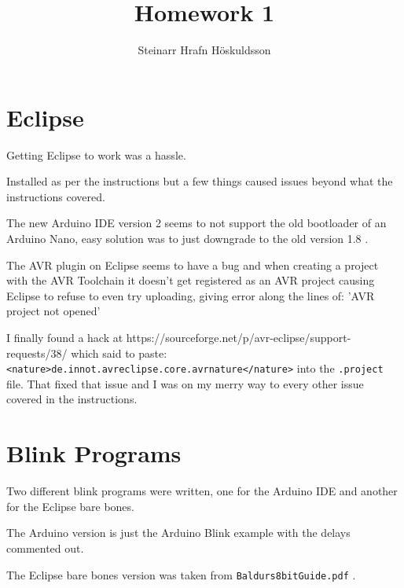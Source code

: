 \documentclass{article}
\title{Homework 1}
\author{Steinarr Hrafn Höskuldsson}
\newcommand{\mycomment}[1]{}
\begin{document}
\mycomment{

\begin{figure}[h]
    \centering
    \texttt{[image: LAB3/Basic1.png]}
    \caption{"Switch test" Breadboard set up}
    \label{fig:Switch_test}
\end{figure}



} %

\pagestyle{firststyle}
{\let\newpage\relax\maketitle}

\section{Eclipse}
Getting Eclipse to work was a hassle.

Installed as per the instructions but a few things caused issues beyond what the instructions covered.

The new Arduino IDE version 2 seems to not support the old bootloader of an Arduino Nano, easy solution was to just downgrade to the old version 1.8 .

The AVR plugin on Eclipse seems to have a bug and when creating a project with the AVR Toolchain it doesn't get registered as an AVR project causing Eclipse to refuse to even try uploading, giving error along the lines of: 'AVR project not opened'

I finally found a hack at https://sourceforge.net/p/avr-eclipse/support-requests/38/ which said to paste: 
\verb#<nature>de.innot.avreclipse.core.avrnature</nature># into the \verb".project" file. That fixed that issue and I was on my merry way to every other issue covered in the instructions.

\section{Blink Programs}
Two different blink programs were written, one for the Arduino IDE and another for the Eclipse bare bones.

The Arduino version is just the Arduino Blink example with the delays commented out.

The Eclipse bare bones version was taken from \verb"Baldurs8bitGuide.pdf" .
\end{document}
